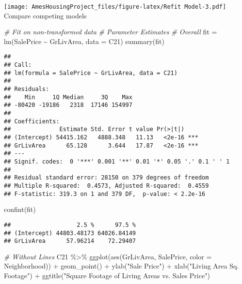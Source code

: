 \documentclass[
]{article}
\newenvironment{Shaded}{\begin{snugshade}}{\end{snugshade}}
\newcommand{\AttributeTok}[1]{\textcolor[rgb]{0.77,0.63,0.00}{#1}}
\newcommand{\CommentTok}[1]{\textcolor[rgb]{0.56,0.35,0.01}{\textit{#1}}}
\newcommand{\FunctionTok}[1]{\textcolor[rgb]{0.00,0.00,0.00}{#1}}
\newcommand{\NormalTok}[1]{#1}
\newcommand{\OtherTok}[1]{\textcolor[rgb]{0.56,0.35,0.01}{#1}}
\newcommand{\SpecialCharTok}[1]{\textcolor[rgb]{0.00,0.00,0.00}{#1}}
\newcommand{\StringTok}[1]{\textcolor[rgb]{0.31,0.60,0.02}{#1}}
\begin{document}
\texttt{[image: AmesHousingProject\_files/figure-latex/Refit Model-3.pdf]}
Compare competing models

\begin{Shaded}
\begin{Highlighting}[]
\CommentTok{\# Fit on non{-}transformed data}
\CommentTok{\# Parameter Estimates}
\CommentTok{\# Overall}
\NormalTok{fit }\OtherTok{=} \FunctionTok{lm}\NormalTok{(SalePrice }\SpecialCharTok{\textasciitilde{}}\NormalTok{ GrLivArea, }\AttributeTok{data =}\NormalTok{ C21)}
\FunctionTok{summary}\NormalTok{(fit)}
\end{Highlighting}
\end{Shaded}

\begin{verbatim}
## 
## Call:
## lm(formula = SalePrice ~ GrLivArea, data = C21)
## 
## Residuals:
##    Min     1Q Median     3Q    Max 
## -80420 -19186   2318  17146 154997 
## 
## Coefficients:
##              Estimate Std. Error t value Pr(>|t|)    
## (Intercept) 54415.162   4888.348   11.13   <2e-16 ***
## GrLivArea      65.128      3.644   17.87   <2e-16 ***
## ---
## Signif. codes:  0 '***' 0.001 '**' 0.01 '*' 0.05 '.' 0.1 ' ' 1
## 
## Residual standard error: 28150 on 379 degrees of freedom
## Multiple R-squared:  0.4573, Adjusted R-squared:  0.4559 
## F-statistic: 319.3 on 1 and 379 DF,  p-value: < 2.2e-16
\end{verbatim}

\begin{Shaded}
\begin{Highlighting}[]
\FunctionTok{confint}\NormalTok{(fit)}
\end{Highlighting}
\end{Shaded}

\begin{verbatim}
##                   2.5 %      97.5 %
## (Intercept) 44803.48173 64026.84149
## GrLivArea      57.96214    72.29407
\end{verbatim}

\begin{Shaded}
\begin{Highlighting}[]
\CommentTok{\# Without Lines}
\NormalTok{C21 }\SpecialCharTok{\%\textgreater{}\%} \FunctionTok{ggplot}\NormalTok{(}\FunctionTok{aes}\NormalTok{(GrLivArea, SalePrice, }\AttributeTok{color =}\NormalTok{ Neighborhood)) }\SpecialCharTok{+}
  \FunctionTok{geom\_point}\NormalTok{() }\SpecialCharTok{+}
  \FunctionTok{ylab}\NormalTok{(}\StringTok{"Sale Price"}\NormalTok{) }\SpecialCharTok{+} 
  \FunctionTok{xlab}\NormalTok{(}\StringTok{"Living Area Sq. Footage"}\NormalTok{) }\SpecialCharTok{+} 
  \FunctionTok{ggtitle}\NormalTok{(}\StringTok{"Square Footage of Living Areas vs. Sales Price"}\NormalTok{)}
\end{Highlighting}
\end{Shaded}
\end{document}

